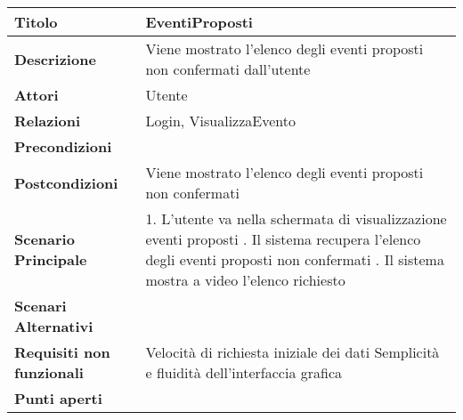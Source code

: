 \begin{tabular} {|P{4.5cm}|P{11cm}|}
  \hline
  \textbf{Titolo}                   & EventiProposti                                                           \\
  \hline
  \textbf{Descrizione}              & Viene mostrato l'elenco degli eventi proposti non confermati dall'utente \\
  \hline
  \textbf{Attori}                   & Utente                                                                   \\
  \hline
  \textbf{Relazioni}                & Login, VisualizzaEvento                                                  \\
  \hline
  \textbf{Precondizioni}            &                                                                          \\
  \hline
  \textbf{Postcondizioni}           & Viene mostrato l'elenco degli eventi proposti non confermati             \\
  \hline
  \textbf{Scenario Principale}      & 1. L'utente va nella schermata di
  visualizzazione eventi proposti . Il sistema recupera l'elenco degli eventi proposti non confermati . Il sistema mostra a video
  l'elenco richiesto                                                                                           \\
  \hline
  \textbf{Scenari Alternativi}      &                                                                          \\
  \hline
  \textbf{Requisiti non funzionali} & Velocità di richiesta iniziale dei dati\linebreak
  Semplicità e fluidità dell'interfaccia grafica                                                               \\
  \hline
  \textbf{Punti aperti}             &                                                                          \\
  \hline
\end{tabular}
\hfill
\break

